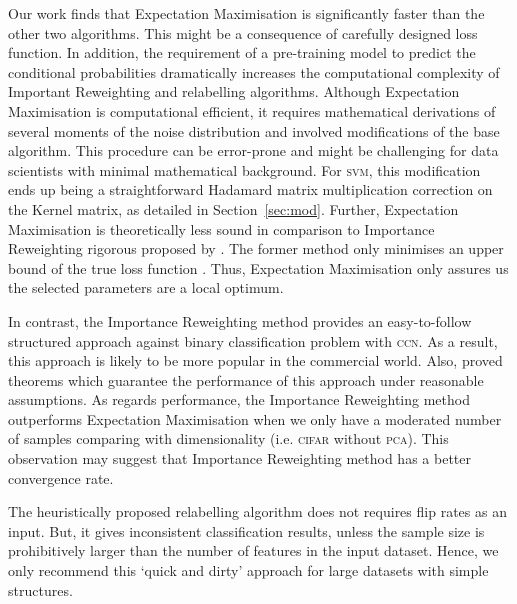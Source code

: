 \documentclass[12pt]{article} %
\newcommand{\svm}{\textsc{svm}}
\begin{document}
Our work finds that Expectation Maximisation is significantly faster than the other two algorithms. This might be a consequence of carefully designed loss function. In addition, the requirement of a pre-training model to predict the conditional probabilities dramatically increases the computational complexity of Important Reweighting and relabelling algorithms. Although Expectation Maximisation is computational efficient, it requires mathematical derivations of several moments of the noise distribution and involved modifications of the base algorithm. This procedure can be error-prone and might be challenging for data scientists with minimal mathematical background. For \svm , this modification ends up being a straightforward Hadamard matrix multiplication correction on the Kernel matrix, as detailed in Section~\ref{sec:mod}. Further, Expectation Maximisation is theoretically less sound in comparison to Importance Reweighting rigorous proposed by \citet{liu2016classification}. The former method only minimises an upper bound of the true loss function \citep{NIPS1999_1672}. Thus, Expectation Maximisation only assures us the selected parameters are a local optimum.

In contrast, the Importance Reweighting method provides an easy-to-follow structured approach against binary classification problem with \textsc{ccn}. As a result, this approach is likely to be more popular in the commercial world. Also, \citet{liu2016classification} proved theorems which guarantee the performance of this approach under reasonable assumptions. As regards performance, the Importance Reweighting method outperforms Expectation Maximisation when we only have a moderated number of samples comparing with dimensionality (i.e. \textsc{cifar} without \textsc{pca}). This observation may suggest that Importance Reweighting method has a better convergence rate. 

The heuristically proposed relabelling algorithm does not requires flip rates as an input. But, it gives inconsistent classification results, unless the sample size is prohibitively larger than the number of features in the input dataset.  Hence, we only recommend this `quick and dirty' approach for large datasets with simple structures. 

\end{document}
